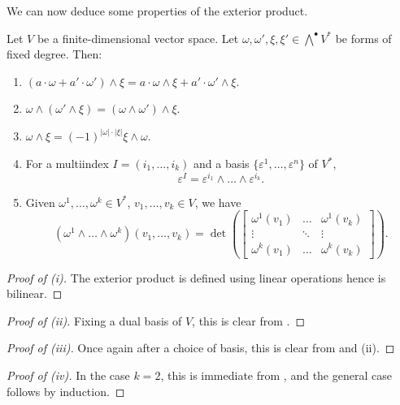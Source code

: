 We can now deduce some properties of the exterior product. 
\begin{proposition}\label{prop: properties of exterior product}
    Let $V$ be a finite-dimensional vector space. Let $\omega,\omega',\xi,\xi'\in\bigwedge^{\bullet}V^{*}$ be forms of fixed degree. Then:
    \begin{enumerate}[label=(\roman*)]
        \item $(a\cdot\omega+a'\cdot\omega')\wedge\xi=a\cdot\omega\wedge\xi+a'\cdot\omega'\wedge\xi$. 
        \item $\omega\wedge(\omega'\wedge\xi)=(\omega\wedge\omega')\wedge\xi$. 
        \item $\omega\wedge\xi=(-1)^{|\omega|\cdot|\xi|}\xi\wedge\omega$. 
        \item For a multiindex $I=(i_{1},\dots,i_{k})$ and a basis $\{\varepsilon^{1},\dots,\varepsilon^{n}\}$ of $V^{*}$, $$\varepsilon^{I}=\varepsilon^{i_{1}}\wedge\dots\wedge\varepsilon^{i_{k}}.$$ 
        \item Given $\omega^{1},\dots,\omega^{k}\in V^{*}$, $v_{1},\dots,v_{k}\in V$, we have 
        $$(\omega^{1}\wedge\dots\wedge\omega^{k})(v_{1},\dots,v_{k})=\det\left(\begin{bmatrix}
            \omega^{1}(v_{1}) & \dots & \omega^{1}(v_{k}) \\
            \vdots & \ddots & \vdots \\ 
            \omega^{k}(v_{1}) & \dots & \omega^{k}(v_{k})
        \end{bmatrix}\right).$$
    \end{enumerate}
\end{proposition}
\begin{proof}[Proof of (i)]
    The exterior product is defined using linear operations  hence is bilinear. 
\end{proof}
\begin{proof}[Proof of (ii)]
    Fixing a dual basis of $V$, this is clear from . 
\end{proof}
\begin{proof}[Proof of (iii)]
    Once again after a choice of basis, this is clear from  and  (ii). 
\end{proof}
\begin{proof}[Proof of (iv)]
    In the case $k=2$, this is immediate from , and the general case follows by induction. 
\end{proof}
